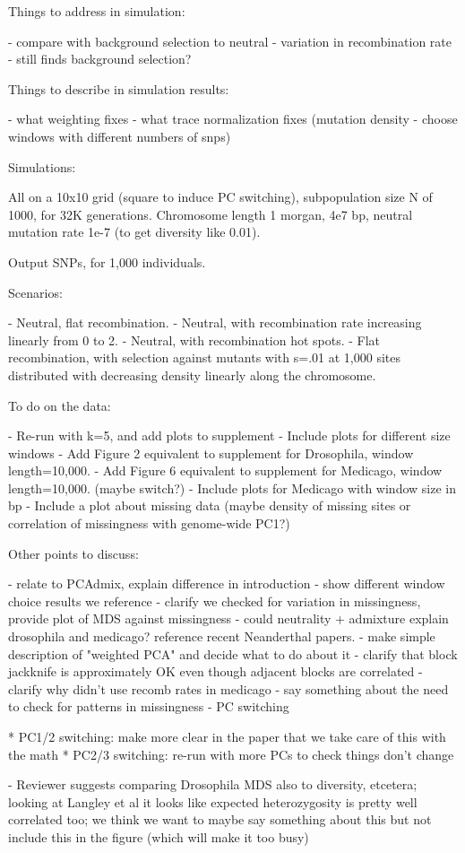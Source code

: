 Things to address in simulation:

- compare with background selection to neutral
- variation in recombination rate - still finds background selection?

Things to describe in simulation results:

- what weighting fixes
- what trace normalization fixes 
    (mutation density - choose windows with different numbers of snps)

Simulations:

All on a 10x10 grid (square to induce PC switching),
subpopulation size N of 1000, for 32K generations.
Chromosome length 1 morgan, 4e7 bp, neutral mutation rate 1e-7 (to get diversity like 0.01).

Output SNPs, for 1,000 individuals.

Scenarios:

- Neutral, flat recombination.
- Neutral, with recombination rate increasing linearly from 0 to 2.
- Neutral, with recombination hot spots.
- Flat recombination, with selection against mutants with s=.01 at 1,000 sites
    distributed with decreasing density linearly along the chromosome.


To do on the data:

- Re-run with k=5, and add plots to supplement
- Include plots for different size windows
- Add Figure 2 equivalent to supplement for Drosophila, window length=10,000.
- Add Figure 6 equivalent to supplement for Medicago, window length=10,000. (maybe switch?)
- Include plots for Medicago with window size in bp
- Include a plot about missing data 
    (maybe density of missing sites or correlation of missingness with genome-wide PC1?)


Other points to discuss:

- relate to PCAdmix, explain difference in introduction
- show different window choice results we reference
- clarify we checked for variation in missingness, provide plot of MDS against missingness
- could neutrality + admixture explain drosophila and medicago? reference recent Neanderthal papers.
- make simple description of "weighted PCA" and decide what to do about it 
- clarify that block jackknife is approximately OK even though adjacent blocks are correlated
- clarify why didn't use recomb rates in medicago
- say something about the need to check for patterns in missingness
- PC switching

    * PC1/2 switching: make more clear in the paper that we take care of this with the math
    * PC2/3 switching: re-run with more PCs to check things don't change

- Reviewer suggests comparing Drosophila MDS also to diversity, etcetera;
    looking at Langley et al it looks like expected heterozygosity is pretty well correlated too;
    we think we want to maybe say something about this but not include this in the figure
    (which will make it too busy)

